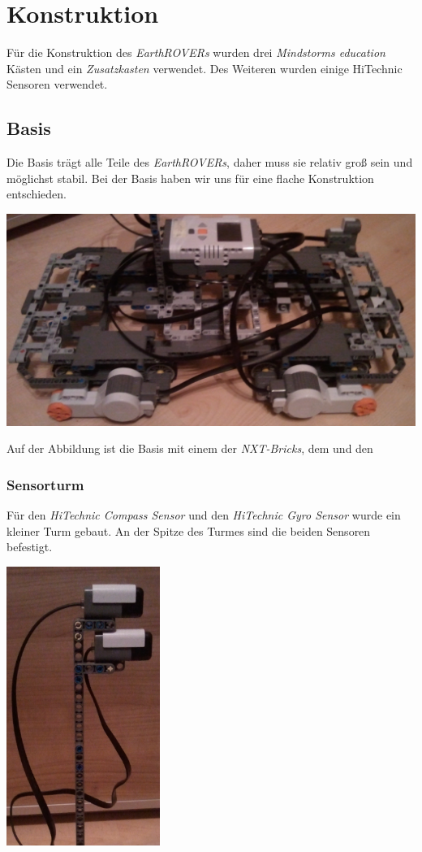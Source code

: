 \chapter{Konstruktion}
Für die Konstruktion des \textit{EarthROVERs} wurden drei \textit{Mindstorms education} Kästen und ein \textit{Zusatzkasten} verwendet. Des Weiteren wurden einige HiTechnic Sensoren verwendet.

\section{Basis}
Die Basis trägt alle Teile des \textit{EarthROVERs}, daher muss sie relativ groß sein und möglichst stabil. Bei der Basis haben wir uns für eine flache Konstruktion entschieden.

\begin{capfigure}[Basis]
	\includegraphics[width=\textwidth]{images/construction/basis/basis}
\end{capfigure}

Auf der Abbildung ist die Basis mit einem der \textit{NXT-Bricks}, dem  und den  

\subsection{Sensorturm}
Für den \textit{HiTechnic Compass Sensor} und den \textit{HiTechnic Gyro Sensor} wurde ein kleiner Turm gebaut. An der Spitze des Turmes sind die beiden Sensoren befestigt.

\begin{capfigure}[Sensorturm]
	\includegraphics[width=5cm]{images/construction/basis/turm}
\end{capfigure}


